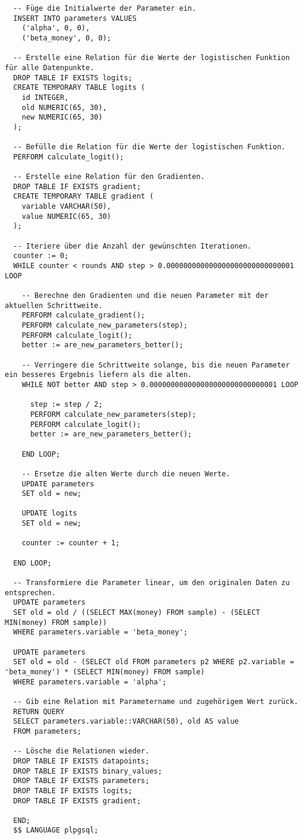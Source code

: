 \begin{verbatim}
  -- Füge die Initialwerte der Parameter ein.
  INSERT INTO parameters VALUES
    ('alpha', 0, 0),
    ('beta_money', 0, 0);

  -- Erstelle eine Relation für die Werte der logistischen Funktion für alle Datenpunkte.
  DROP TABLE IF EXISTS logits;
  CREATE TEMPORARY TABLE logits (
    id INTEGER,
    old NUMERIC(65, 30),
    new NUMERIC(65, 30)
  );

  -- Befülle die Relation für die Werte der logistischen Funktion.
  PERFORM calculate_logit();

  -- Erstelle eine Relation für den Gradienten.
  DROP TABLE IF EXISTS gradient;
  CREATE TEMPORARY TABLE gradient (
    variable VARCHAR(50),
    value NUMERIC(65, 30)
  );

  -- Iteriere über die Anzahl der gewünschten Iterationen.
  counter := 0;
  WHILE counter < rounds AND step > 0.000000000000000000000000000001 LOOP

    -- Berechne den Gradienten und die neuen Parameter mit der aktuellen Schrittweite.
    PERFORM calculate_gradient();
    PERFORM calculate_new_parameters(step);
    PERFORM calculate_logit();
    better := are_new_parameters_better();

    -- Verringere die Schrittweite solange, bis die neuen Parameter ein besseres Ergebnis liefern als die alten.
    WHILE NOT better AND step > 0.000000000000000000000000000001 LOOP

      step := step / 2;
      PERFORM calculate_new_parameters(step);
      PERFORM calculate_logit();
      better := are_new_parameters_better();

    END LOOP;

    -- Ersetze die alten Werte durch die neuen Werte.
    UPDATE parameters
    SET old = new;

    UPDATE logits
    SET old = new;

    counter := counter + 1;

  END LOOP;

  -- Transformiere die Parameter linear, um den originalen Daten zu entsprechen.
  UPDATE parameters
  SET old = old / ((SELECT MAX(money) FROM sample) - (SELECT MIN(money) FROM sample))
  WHERE parameters.variable = 'beta_money';

  UPDATE parameters
  SET old = old - (SELECT old FROM parameters p2 WHERE p2.variable = 'beta_money') * (SELECT MIN(money) FROM sample)
  WHERE parameters.variable = 'alpha';

  -- Gib eine Relation mit Parametername und zugehörigem Wert zurück.
  RETURN QUERY
  SELECT parameters.variable::VARCHAR(50), old AS value
  FROM parameters;

  -- Lösche die Relationen wieder.
  DROP TABLE IF EXISTS datapoints;
  DROP TABLE IF EXISTS binary_values;
  DROP TABLE IF EXISTS parameters;
  DROP TABLE IF EXISTS logits;
  DROP TABLE IF EXISTS gradient;

  END;
  $$ LANGUAGE plpgsql;
\end{verbatim}

